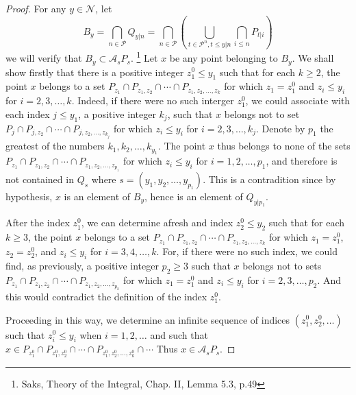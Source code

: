 \begin{proof}
For any $y\in\mathcal{N}$, let
\[
  B_y = \bigcap_{n\in\mathcal{P}} Q_{y|n}
      = \bigcap_{n\in\mathcal{P}} 
        \left( 
          \bigcup_{t\in\mathcal{P}^n, t\le y|n} \bigcap_{i\le n} P_{t|i} 
        \right)
\]
we will verify that $B_y\subset \mathcal{A}_s P_s$. 
  \footnote{
    Saks, Theory of the Integral, Chap. II, Lemma 5.3, p.49
  }
Let $x$ be any point belonging to $B_y$. We shall show firstly that there is a 
positive integer $z^0_1\le y_1$ such that for each $k\ge 2$, the point $x$
belongs to a set $P_{z_1}\cap P_{z_1,z_2} \cap \cdots \cap P_{z_1,z_2,\dots,z_k}$
for which $z_1=z_1^0$ and $z_i\le y_i$ for $i=2,3,\dots,k$. Indeed, if there were
no such interger $z_1^0$, we could associate with each index $j\le y_1$, a 
positive integer $k_j$, such that $x$ belongs not to set 
$P_{j}\cap P_{j,z_2} \cap \cdots \cap P_{j,z_2,\dots,z_{k_j}}$
for which $z_i\le y_i$ for $i=2,3,\dots,k_j$. Denote by $p_1$ the greatest of 
the numbers $k_1,k_2,\dots,k_{y_1}$. The point $x$ thus belongs to none of the
sets $P_{z_1}\cap P_{z_1,z_2} \cap \cdots \cap P_{z_1,z_2,\dots,z_{p_1}}$
for which $z_i\le y_i$ for $i=1,2,\dots,p_1$, and therefore is not contained
in $Q_s$ where $s=(y_1,y_2,\dots,y_{p_1})$. This is a contradition since by 
hypothesis, $x$ is an element of $B_y$, hence is an element of $Q_{y|p_1}$.

After the index $z_1^0$, we can determine afresh and index $z_2^0\le y_2$
such that for each $k\ge 3$, the point $x$ belongs to a set
$P_{z_1}\cap P_{z_1,z_2} \cap \cdots \cap P_{z_1,z_2,\dots,z_k}$
for which $z_1=z_1^0$, $z_2=z_2^0$, and $z_i\le y_i$ for $i=3,4,\dots,k$. 
For, if there were no such index, we could find, as previously, a positive 
integer $p_2\ge 3$ such that $x$ belongs not to sets 
$P_{z_1}\cap P_{z_1,z_2} \cap \cdots \cap P_{z_1,z_2,\dots,z_{p_2}}$
for which $z_1=z_1^0$ and $z_i\le y_i$ for $i=2,3,\dots,p_2$. And this would
contradict the definition of the index $z_1^0$.

Proceeding in this way, we determine an infinite sequence of indices
$(z_1^0,z_2^0,\dots)$ such that $z_i^0\le y_i$ when $i=1,2,\dots$ and such
that 
$x\in P_{z_1^0}\cap P_{z_1^0,z_2^0} \cap \cdots \cap P_{z_1^0,z_2^0,\dots,z_k^0} \cap \cdots$
Thus $x\in \mathcal{A}_s P_s$.

\end{proof}

